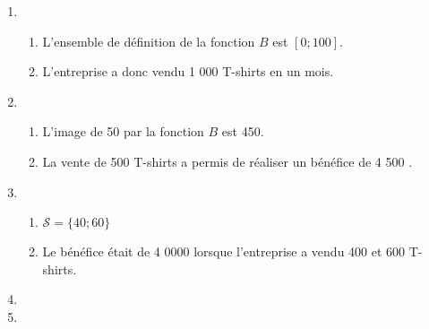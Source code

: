 \documentclass[a4paper]{article}
\renewcommand\euro{\officialeuro\xspace}
\begin{document}
    \begin{exercice}{}{}
     \begin{enumerate}
      \item \begin{enumerate}
        \item L'ensemble de définition de la fonction $B$ est $[0 ; 100]$.
        \item L'entreprise a donc vendu 1 000 T-shirts en un mois.

      \end{enumerate}
      \item \begin{enumerate}
        \item L'image de 50 par la fonction $B$ est 450.
        \item La vente de 500 T-shirts a permis de réaliser un bénéfice de 4 500 \euro{}. 
      \end{enumerate}
      \item \begin{enumerate}
        \item $\mathcal{S} = \{40 ; 60 \}$
        \item Le bénéfice était de 4 0000 \euro{} lorsque l'entreprise a vendu 400 et 600 T-shirts.
      \end{enumerate}
      \item {}
     \item {}
     \end{enumerate}
    \end{exercice}

    \medskip
\end{document}
